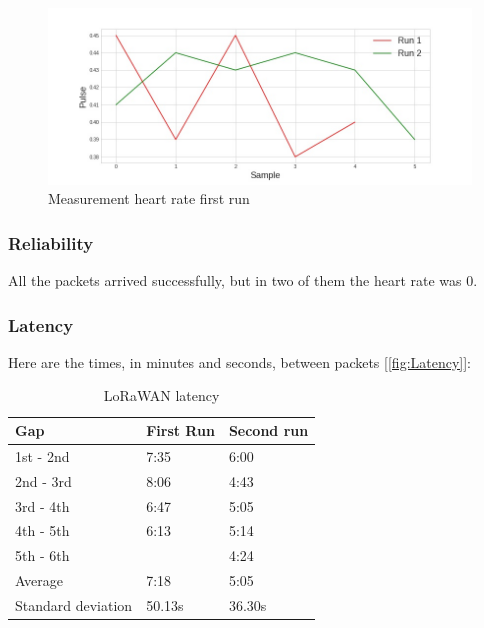 			\begin{figure}[h!]
				\centering
				\includegraphics[width=1.1\linewidth]{gfx/pressure_diff.jpg}
				\caption{Measurement heart rate first run}
				\label{fig:PressureDiff}
			\end{figure}
		\newpage
		\subsubsection{Reliability}
			All the packets arrived successfully, but in two of them the heart rate was 0.

		\subsubsection{Latency}
			Here are the times, in minutes and seconds, between packets [\ref{fig:Latency}]:
			\begin{table}[h!]
				\centering
				\begin{tabular}{@{}lll@{}}
					\toprule
					\textbf{Gap}&\textbf{First Run}& \textbf{Second run} 	 \\ \midrule
					1st - 2nd 			&	7:35		& 	6:00     	 \\
					2nd - 3rd 			&	8:06    	& 	4:43         \\
					3rd - 4th 			&	6:47		& 	5:05         \\
					4th - 5th 			&	6:13    	& 	5:14         \\
					5th - 6th 			&	         	& 	4:24         \\ \bottomrule
					Average     		&   7:18        &   5:05		 \\
					Standard deviation  &   50.13s      &   36.30s		 \\ \bottomrule
				\end{tabular}
				\caption[LoRaWAN latency]{LoRaWAN latency}
				\label{tab:Latency}
			\end{table}
			
